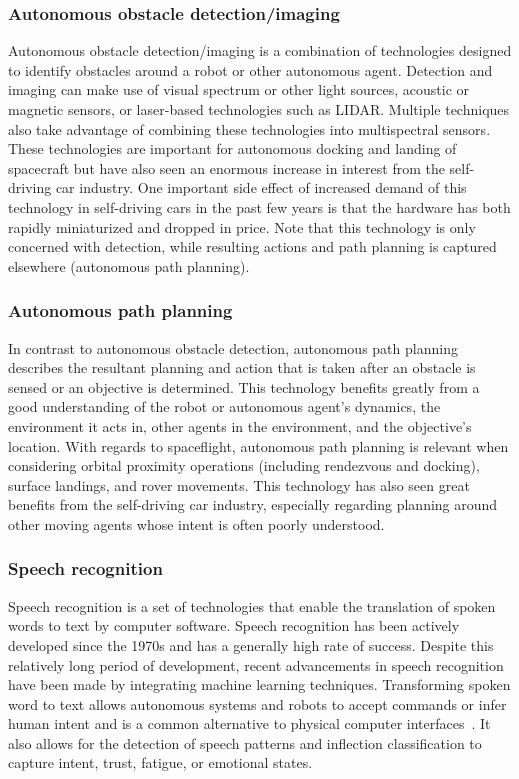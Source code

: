 \subsubsection{Autonomous obstacle detection/imaging}
Autonomous obstacle detection/imaging is a combination of technologies designed to identify obstacles around a robot or other autonomous agent.
Detection and imaging can make use of visual spectrum or other light sources, acoustic or magnetic sensors, or laser-based technologies such as LIDAR.
Multiple techniques also take advantage of combining these technologies into multispectral sensors.
These technologies are important for autonomous docking and landing of spacecraft but have also seen an enormous increase in interest from the self-driving car industry.
One important side effect of increased demand of this technology in self-driving cars in the past few years is that the hardware has both rapidly miniaturized and dropped in price.
Note that this technology is only concerned with detection, while resulting actions and path planning is captured elsewhere (autonomous path planning).

\subsubsection{Autonomous path planning}
In contrast to autonomous obstacle detection, autonomous path planning describes the resultant planning and action that is taken after an obstacle is sensed or an objective is determined.
This technology benefits greatly from a good understanding of the robot or autonomous agent's dynamics, the environment it acts in, other agents in the environment, and the objective's location.
With regards to spaceflight, autonomous path planning is relevant when considering orbital proximity operations (including rendezvous and docking), surface landings, and rover movements.
This technology has also seen great benefits from the self-driving car industry, especially regarding planning around other moving agents whose intent is often poorly understood.

\subsubsection{Speech recognition}
Speech recognition is a set of technologies that enable the translation of spoken words to text by computer software.
Speech recognition has been actively developed since the 1970s and has a generally high rate of success.
Despite this relatively long period of development, recent advancements in speech recognition have been made by integrating machine learning techniques.
Transforming spoken word to text allows autonomous systems and robots to accept commands or infer human intent and is a common alternative to physical computer interfaces~\citep{tsarouchi_humanrobot_2016}.
It also allows for the detection of speech patterns and inflection classification to capture intent, trust, fatigue, or emotional states.

